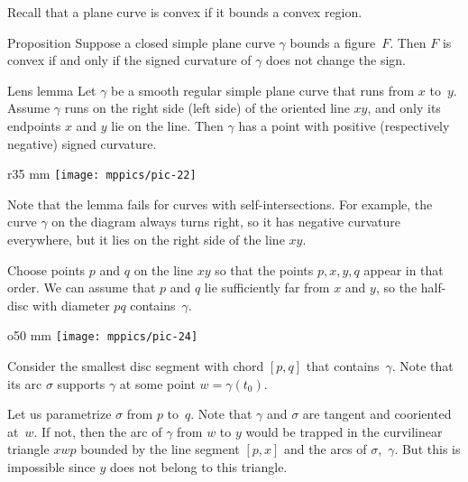 Recall that a plane curve is convex if it bounds a convex region.

\begin{thm}{Proposition}\label{prop:convex}
Suppose a closed simple plane curve $\gamma$ bounds a figure~$F$.
Then $F$ is convex if and only if the signed curvature of $\gamma$ does not change the sign.
\end{thm}


\begin{thm}{Lens lemma}\label{lem:lens}
Let $\gamma$ be a smooth regular simple plane curve that runs from $x$ to~$y$.
Assume $\gamma$ runs on the right side (left side) of the oriented line $xy$, and only its endpoints $x$ and $y$ lie on the line.
Then $\gamma$ has a point with positive (respectively negative) signed curvature.
\end{thm}

{

\begin{wrapfigure}{r}{35 mm}
\vskip-4mm
\centering
\texttt{[image: mppics/pic-22]}
\vskip0mm
\end{wrapfigure}

Note that the lemma fails for curves with self-intersections.
For example, the curve $\gamma$ on the diagram always turns right, 
so it has negative curvature everywhere, but it lies on the right side of the line $xy$.

}

Choose points $p$ and $q$ on the line $xy$
so that the points $p, x, y, q$ appear in that order.
We can assume that $p$ and $q$ lie sufficiently far from $x$ and $y$, so the half-disc with diameter $pq$ contains~$\gamma$.

\begin{wrapfigure}[6]{o}{50 mm}
\vskip-3mm
\centering
\texttt{[image: mppics/pic-24]}
\end{wrapfigure}

Consider the smallest disc segment with chord $[p,q]$ that contains~$\gamma$.
Note that its arc $\sigma$ supports $\gamma$ at some point $w=\gamma(t_0)$.

Let us parametrize $\sigma$ from $p$ to~$q$.
Note that $\gamma$ and $\sigma$ are tangent and cooriented at~$w$.
If not, then the arc of $\gamma$ from $w$ to $y$ would be trapped in the curvilinear triangle $xwp$ bounded by the line segment $[p,x]$ and the arcs of $\sigma$,~$\gamma$.
But this is impossible since $y$ does not belong to this triangle.

